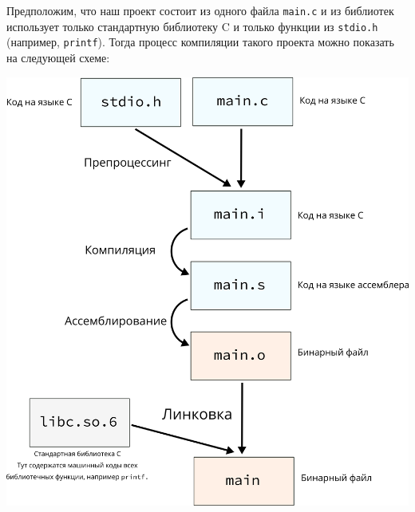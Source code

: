 \documentclass{article}
\begin{document}
Предположим, что наш проект состоит из одного файла \texttt{main.c} и из библиотек использует только стандартную библиотеку C и только функции из \texttt{stdio.h} (например,  \texttt{printf}). Тогда процесс компиляции такого проекта можно показать на следующей схеме:\\

\begin{center}
\includegraphics[scale=0.8]{../images/01stages.png}
\end{center}
\end{document}

